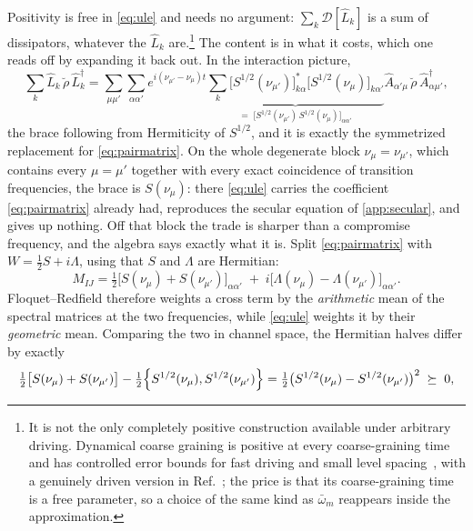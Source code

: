 \documentclass[a4paper,11pt]{article}
\newcommand{\Dcal}{\mathcal{D}}
\begin{document}
Positivity is free in \eqref{eq:ule} and needs no argument: $\sum_k\Dcal[\hat L_k]$ is a sum of dissipators, whatever the $\hat L_k$ are.\footnote{It is not the only completely positive construction available under arbitrary driving. Dynamical coarse graining is positive at every coarse-graining time~\cite{Schaller2008Preservation} and has controlled error bounds for fast driving and small level spacing~\cite{Mozgunov2020Completely}, with a genuinely driven version in Ref.~\cite{Hotz2021Coarse}; the price is that its coarse-graining time is a free parameter, so a choice of the same kind as $\bar\omega_m$ reappears inside the approximation.} The content is in what it costs, which one reads off by expanding it back out. In the interaction picture,
\begin{equation}\label{eq:ule-expand}
  \sum_k \hat L_k\,\breve\rho\,\hat L_k^\dagger
  = \sum_{\mu\mu'}\sum_{\alpha\alpha'} e^{i(\nu_{\mu'}-\nu_\mu)t}
  \underbrace{\sum_k \big[S^{1/2}(\nu_{\mu'})\big]^{*}_{k\alpha}\big[S^{1/2}(\nu_\mu)\big]_{k\alpha'}}_{\textstyle =\;\big[S^{1/2}(\nu_{\mu'})\,S^{1/2}(\nu_\mu)\big]_{\alpha\alpha'}}
  \hat A_{\alpha'\mu}\,\breve\rho\,\hat A^\dagger_{\alpha\mu'},
\end{equation}
the brace following from Hermiticity of $S^{1/2}$, and it is exactly the symmetrized replacement for \eqref{eq:pairmatrix}. On the whole degenerate block $\nu_\mu = \nu_{\mu'}$, which contains every $\mu=\mu'$ together with every exact coincidence of transition frequencies, the brace is $S(\nu_\mu)$: there \eqref{eq:ule} carries the coefficient \eqref{eq:pairmatrix} already had, reproduces the secular equation of \cref{app:secular}, and gives up nothing. Off that block the trade is sharper than a compromise frequency, and the algebra says exactly what it is. Split \eqref{eq:pairmatrix} with $W = \tfrac12 S + i\Lambda$, using that $S$ and $\Lambda$ are Hermitian:
\begin{equation}\label{eq:pairsplit}
  M_{IJ} = \tfrac12\big[S(\nu_\mu) + S(\nu_{\mu'})\big]_{\alpha\alpha'}
  \;+\; i\big[\Lambda(\nu_\mu) - \Lambda(\nu_{\mu'})\big]_{\alpha\alpha'} .
\end{equation}
Floquet--Redfield therefore weights a cross term by the \emph{arithmetic} mean of the spectral matrices at the two frequencies, while \eqref{eq:ule} weights it by their \emph{geometric} mean. Comparing the two in channel space, the Hermitian halves differ by exactly
\begin{equation}\label{eq:ule-deficit}
  \tfrac12\big[S(\nu_\mu) + S(\nu_{\mu'})\big]
  - \tfrac12\acomm{S^{1/2}(\nu_\mu)}{S^{1/2}(\nu_{\mu'})}
  = \tfrac12\big(S^{1/2}(\nu_\mu) - S^{1/2}(\nu_{\mu'})\big)^{2} \;\succeq\; 0 ,
\end{equation}
\end{document}

